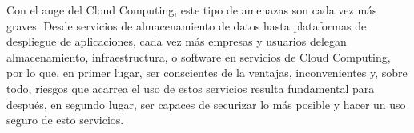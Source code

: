 Con el auge del Cloud Computing, este tipo de amenazas son cada vez más graves. Desde servicios de almacenamiento de datos hasta plataformas de despliegue de aplicaciones, cada vez más empresas y usuarios delegan almacenamiento, infraestructura, o software en servicios de Cloud Computing, por lo que, en primer lugar, ser conscientes de la ventajas, inconvenientes y, sobre todo, riesgos que acarrea el uso de estos servicios resulta fundamental para después, en segundo lugar, ser capaces de securizar lo más posible y hacer un uso seguro de esto servicios.
